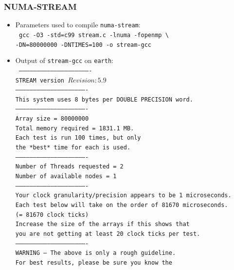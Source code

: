 \subsubsection{NUMA-STREAM}
\begin{itemize}
	\item Parameters used to compile \texttt{numa-stream}: \\
	\texttt{
		gcc -O3 -std=c99 stream.c -lnuma -fopenmp \textbackslash \\
		-DN=80000000 -DNTIMES=100 -o stream-gcc
	}
	
	\item Output of \texttt{stream-gcc} on \texttt{earth}: \\
	\texttt{\tiny 
		------------------------------------------------------------- \\
		STREAM version $Revision: 5.9 $ \\
		------------------------------------------------------------- \\
		This system uses 8 bytes per DOUBLE PRECISION word. \\
		------------------------------------------------------------- \\
		Array size = 80000000 \\
		Total memory required = 1831.1 MB. \\
		Each test is run 100 times, but only \\
		the *best* time for each is used. \\
		------------------------------------------------------------- \\
		Number of Threads requested = 2 \\
		Number of available nodes = 1 \\
		------------------------------------------------------------- \\
		Your clock granularity/precision appears to be 1 microseconds. \\
		Each test below will take on the order of 81670 microseconds. \\
		(= 81670 clock ticks) \\
		Increase the size of the arrays if this shows that \\
		you are not getting at least 20 clock ticks per test. \\
		------------------------------------------------------------- \\
		WARNING -- The above is only a rough guideline. \\
		For best results, please be sure you know the \\
}
\end{itemize}
